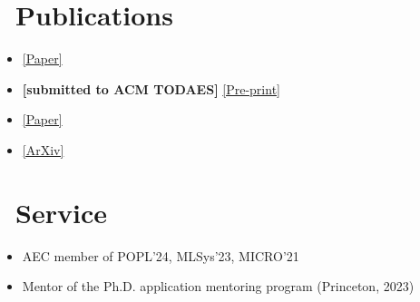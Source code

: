 \documentclass{resume}
\begin{document}
\section{\faLeanpub\ Publications}
\begin{itemize}
    \item {} \href{https://only.rs/assets/papers/EGRAPHS2023.pdf}{[Paper]}
    \item \textbf{[submitted to ACM TODAES]} \href{https://vcanumalla.github.io/pubs/2023-todaes-3la.pdf}{[Pre-print]}
    \item {} \href{https://vlsiarch.eecs.harvard.edu/publications/dsls-accelerator-rich-platform-implementations-addressing-mapping-gap}{[Paper]}
    \item {} \href{https://arxiv.org/abs/2006.09616}{[ArXiv]}
\end{itemize}

\section{\faHandGrabO\ Service}
\begin{itemize}
    \item AEC member of POPL'24, MLSys'23, MICRO'21
    \item Mentor of the Ph.D. application mentoring program (Princeton, 2023)
\end{itemize}
\end{document}
